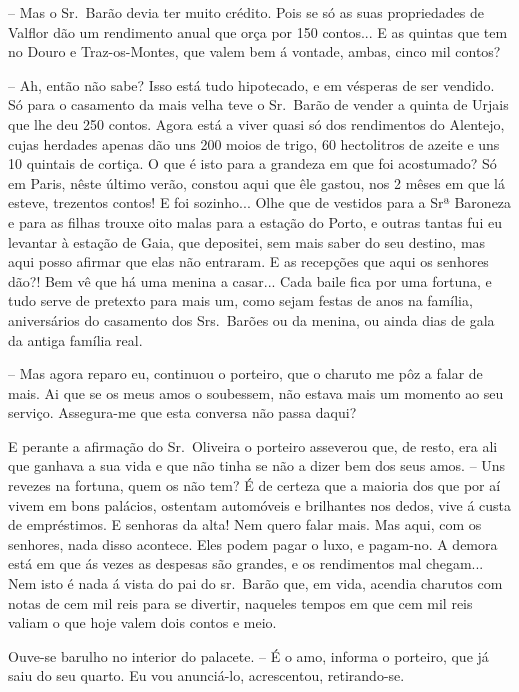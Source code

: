 \documentclass[9pt]{article}
\begin{document}
-- Mas o Sr.\ Barão devia ter muito crédito. Pois se só as suas propriedades de Valflor dão um rendimento anual que orça por 150 contos... E as
quintas que tem no Douro e Traz-os-Montes, que valem bem á vontade, ambas,
cinco mil contos?

-- Ah, então não sabe? Isso está tudo hipotecado, e em vésperas de ser
vendido. Só para o casamento da mais ve\-lha teve o Sr.\ Barão de vender
a quinta de Urjais que lhe deu 250 contos. Agora está a viver quasi só dos
rendimentos do Alentejo, cujas  herdades apenas dão uns 200 moios de trigo,
60 hectolitros de azeite e uns 10 quintais de cortiça. O que é isto para
a gran\-deza em que foi acostumado? Só em Paris, nês\-te último verão, constou
aqui que êle gastou, nos 2 mêses em que lá esteve, trezentos contos! E foi
sozinho... O\-lhe que de vestidos para a Srª Baroneza e para as fi\-lhas
trouxe oito malas para a esta\-ção do Porto, e outras tantas fui eu levantar
à esta\-ção de Gaia, que depositei, sem mais saber do seu destino, mas aqui posso afirmar que elas não entraram. E as recep\-ções que aqui os senhores dão?!
Bem vê que há uma menina a casar... Cada baile fi\-ca por uma fortuna, e tudo
serve de pretexto para mais um, como sejam festas de anos na fa\-mí\-lia, aniversários do casamento dos Srs.\ Barões ou da menina, ou ainda dias de gala da
antiga fa\-mí\-lia real.

-- Mas agora reparo eu, continuou o porteiro, que o charuto me pôz a falar de mais. Ai que se os meus amos o soubessem, não estava mais um momento
ao seu serviço. Assegura-me que esta conversa não passa daqui?

E perante a afirma\-ção do Sr.\ Oliveira o porteiro asseverou que, de resto, era ali que ganhava a sua vida e que não tinha se não a dizer bem dos
seus amos. -- Uns revezes na fortuna, quem os não tem? É de certeza que a
maioria dos que por aí vivem em bons palácios, ostentam automóveis e bri\-lhantes nos dedos, vive á custa de empréstimos. E senhoras da alta! Nem quero
falar mais. Mas aqui, com os senhores, nada disso acontece. Eles podem pagar
o luxo, e pagam-no. A demora está em que ás vezes as despesas são gran\-des, e
os rendimentos mal chegam... Nem isto é nada á vista do pai do sr.\ Barão
que, em vida, acendia charutos com notas de cem mil reis para se divertir, naqueles tempos em que cem mil reis valiam o que hoje valem dois contos e
meio.

Ouve-se baru\-lho no interior do palacete. -- É o amo, informa o porteiro,
que já saiu do seu quarto. Eu vou anunciá-lo, acrescentou, retirando-se.
\end{document}
